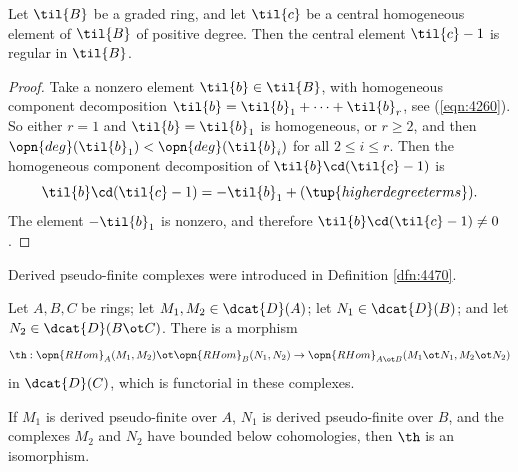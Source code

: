 \begin{lem} \label{lem:4505}
Let $\til{B}$ be a graded ring, and let $\til{c}$ be a central homogeneous 
element of $\til{B}$ of positive degree. 
Then the central element $\til{c} - 1$ is regular in $\til{B}$.
\end{lem}

\begin{proof}
Take a nonzero element $\til{b} \in \til{B}$,
with homogeneous component decomposition 
$\til{b} = \til{b}_{1} + \cdots + \til{b}_{r}$, 
see (\ref{eqn:4260}). So either $r = 1$ and $\til{b} = \til{b}_{1}$
is homogeneous, or $r \geq 2$, and then
$\opn{deg}(\til{b}_{1}) < \opn{deg}(\til{b}_{i})$ for all 
$2 \leq i \leq r$. Then the homogeneous component decomposition
of $\til{b} \cd (\til{c} - 1)$ is 
\[ \til{b} \cd (\til{c} - 1) = - \til{b}_{1} + 
(\tup{higher degree terms}) . \]
The element $-\til{b}_{1}$ is nonzero, and therefore 
$\til{b} \cd (\til{c} - 1) \neq 0$. 
\end{proof}

Derived pseudo-finite complexes were introduced in Definition 
\ref{dfn:4470}.

\begin{lem} \label{lem:4406}
Let $A, B, C$ be rings; let 
$M_1, M_2 \in \dcat{D}(A)$; let $N_1 \in \dcat{D}(B)$; and let 
$N_2 \in \dcat{D}(B \ot C)$.
There is a morphism 
\[ \th : \opn{RHom}_{A}(M_1, M_2) \ot \opn{RHom}_{B}(N_1, N_2) \to 
\opn{RHom}_{A \ot B}(M_1 \ot N_1, M_2 \ot N_2) \]
in $\dcat{D}(C)$, which is functorial in these complexes. 

If $M_1$ is derived pseudo-finite over $A$, $N_1$ is derived pseudo-finite 
over $B$, and the complexes $M_2$ and $N_2$ have bounded below cohomologies, 
then $\th$ is an isomorphism. 
\end{lem}

